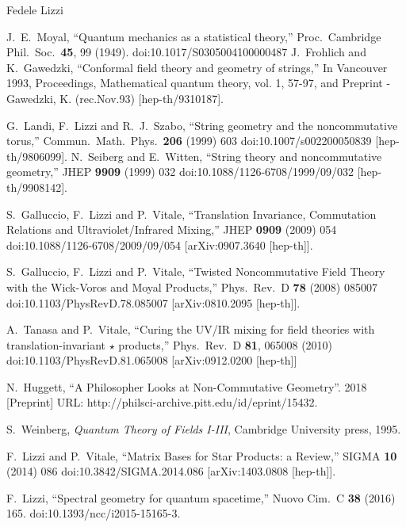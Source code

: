 \begin{artengenv}{Fedele Lizzi}
\begin{thebibliography}{99}
 J.~E.~Moyal,
  ``Quantum mechanics as a statistical theory,''
  Proc.\ Cambridge Phil.\ Soc.\  {\bf 45}, 99 (1949).
  doi:10.1017/S0305004100000487
 J.~Frohlich and K.~Gawedzki,
  ``Conformal field theory and geometry of strings,''
  In Vancouver 1993, Proceedings, Mathematical quantum theory, vol. 1, 57-97, and Preprint - Gawedzki, K. (rec.Nov.93)   [hep-th/9310187].
  
 G.~Landi, F.~Lizzi and R.~J.~Szabo,
  ``String geometry and the noncommutative torus,''
  Commun.\ Math.\ Phys.\  {\bf 206} (1999) 603
  doi:10.1007/s002200050839
  [hep-th/9806099].
 N.~Seiberg and E.~Witten,
  ``String theory and noncommutative geometry,''
  JHEP {\bf 9909} (1999) 032
  doi:10.1088/1126-6708/1999/09/032
  [hep-th/9908142].


 S.~Galluccio, F.~Lizzi and P.~Vitale,
  ``Translation Invariance, Commutation Relations and Ultraviolet/Infrared Mixing,''
  JHEP {\bf 0909} (2009) 054
  doi:10.1088/1126-6708/2009/09/054
  [arXiv:0907.3640 [hep-th]].

  S.~Galluccio, F.~Lizzi and P.~Vitale,
  ``Twisted Noncommutative Field Theory with the Wick-Voros and Moyal Products,''
  Phys.\ Rev.\ D {\bf 78} (2008) 085007
  doi:10.1103/PhysRevD.78.085007
  [arXiv:0810.2095 [hep-th]].
  
A.~Tanasa and P.~Vitale,
  ``Curing the UV/IR mixing for field theories with translation-invariant $\star$ products,''
  Phys.\ Rev.\ D {\bf 81}, 065008 (2010)
  doi:10.1103/PhysRevD.81.065008
  [arXiv:0912.0200 [hep-th]]
  
 N.\ Huggett, ``A Philosopher Looks at Non-Commutative Geometry''.  2018  [Preprint]     URL: http://philsci-archive.pitt.edu/id/eprint/15432.

 S.\ Weinberg, \textit{Quantum Theory of Fields I-III}, Cambridge University press, 1995.

 F.~Lizzi and P.~Vitale,
  ``Matrix Bases for Star Products: a Review,''
  SIGMA {\bf 10} (2014) 086
  doi:10.3842/SIGMA.2014.086
  [arXiv:1403.0808 [hep-th]].
  
 F.~Lizzi,
  ``Spectral geometry for quantum spacetime,''
  Nuovo Cim.\ C {\bf 38} (2016) 165.
  doi:10.1393/ncc/i2015-15165-3.
  

\end{thebibliography}
\end{artengenv}
